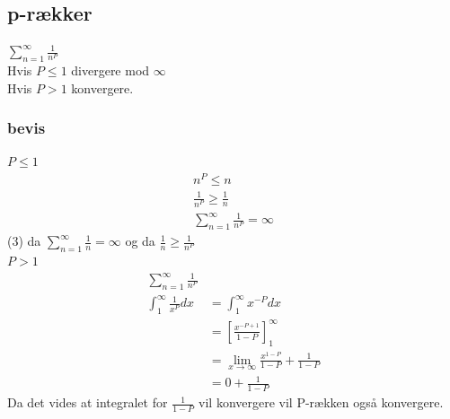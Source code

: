 \documentclass[12pt, a4paper]{article}
\begin{document}
	\subsection{p-rækker}
		$\sum\limits_{n=1}^{\infty}\frac{1}{n^P}$\\
		Hvis $P\leq 1$ divergere mod $\infty$\\
		Hvis $P>1$ konvergere.\\
		\subsubsection{bevis}
			$P\leq 1$
			\begin{align}
				n^P\leq n\\
				\frac{1}{n^P}\geq \frac{1}{n}\\
				\sum\limits_{n=1}^{\infty}\frac{1}{n^P}=\infty
			\end{align}
			(3) da $\sum\limits_{n=1}^{\infty}\frac{1}{n}=\infty$ og da $\frac{1}{n}\geq \frac{1}{n^P}$\\
			$P>1$
			\begin{align}
				\sum\limits_{n=1}^{\infty}\frac{1}{n^P}\\
				\int_1^{\infty}\frac{1}{x^P}dx&=\int_1^\infty x^{-P}dx\\
									&=[\frac{x^{-P+1}}{1-P}]^{\infty}_1\\
									&=\lim\limits_{x\rightarrow \infty}\frac{x^{1-P}}{1-P}+\frac{1}{1-P}\\
									&=0+\frac{1}{1-P}
			\end{align}
			Da det vides at integralet for $\frac{1}{1-P}$ vil konvergere vil P-rækken også konvergere.
\end{document}
